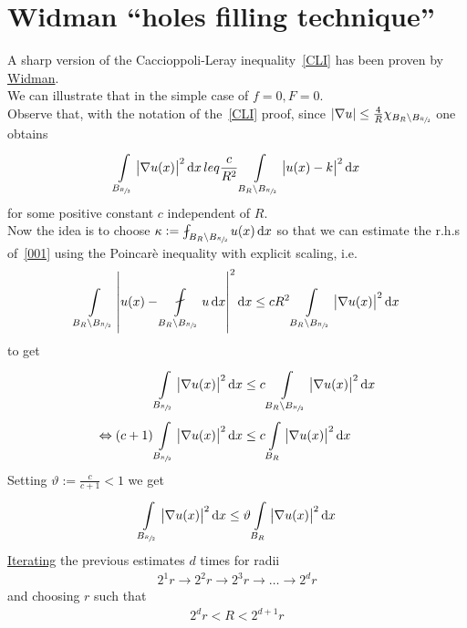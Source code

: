 \section{Widman ``holes filling technique''}

A sharp version of the Caccioppoli-Leray inequality~\eqref{CLI} has been proven by \underline{Widman}.\\
We can illustrate that in the simple case of \(f=0, F=0\).\\
Observe that, with the notation of the~\eqref{CLI} proof, since \(\abs{\nabla u}\leq \frac{4}{R} \chi_{B_{R}\setminus B_{\sfrac{R}{2}}}\) one obtains
\begin{gather}
    \int\limits_{B_{\sfrac{R}{2}}}^{} \abs{\nabla u(x)}^{2} \dd{x} leq \frac{c}{R^{2}} \int\limits_{B_{R} \setminus B_{\sfrac{R}{2}}}^{} \abs{u(x)-k}^{2} \dd{x} \label{001}
\end{gather}
for some positive constant \(c\) independent of \(R\).\\
Now the idea is to choose \(\kappa := \fint_{B_{R}\setminus B_{\sfrac{R}{2}}} u(x) \dd{x}\) so that we can estimate the r.h.s of~\eqref{001} using the Poincarè inequality with explicit scaling, i.e.
\begin{gather}
    \int\limits_{B_{R}\setminus B_{\sfrac{R}{2}}}^{} \abs{u(x)-\fint\limits_{B_{R}\setminus B_{\sfrac{R}{2}}}^{} u \dd{x} }^{2} \dd{x} \leq cR^{2}\int\limits_{B_{R}\setminus B_{\sfrac{R}{2}}}^{} \abs{\nabla u(x)}^{2} \dd{x}
\end{gather}
to get
\begin{align}
                           & \int\limits_{B_{\sfrac{R}{2}}}^{} \abs{\nabla u(x)}^{2} \dd{x} \leq c \int\limits_{B_{R}\setminus B_{\sfrac{R}{2}}}^{} \abs{\nabla u(x)}^{2} \dd{x} \\
    \Leftrightarrow  (c+1) & \int\limits_{B_{\sfrac{R}{2}}}^{} \abs{\nabla u(x)}^{2} \dd{x} \leq c \int\limits_{B_{R}}^{} \abs{\nabla u(x)}^{2} \dd{x}
\end{align}
Setting \( \vartheta := \frac{c}{c+1}<1\) we get
\begin{gather}
    \int\limits_{B_{\sfrac{R}{2}}}^{} \abs{\nabla u(x)}^{2} \dd{x} \leq \vartheta \int\limits_{B_{R}}^{} \abs{\nabla u(x)}^{2} \dd{x}
\end{gather}
\underline{Iterating} the previous estimates \(d\) times for radii
\begin{gather}
    2^{1}r \to 2^{2}r \to 2^{3}r \to \dots \to 2^{d}r
\end{gather}
and choosing \(r\) such that
\begin{gather}
    2^{d}r < R< 2^{d+1}r \label{002}
\end{gather}
